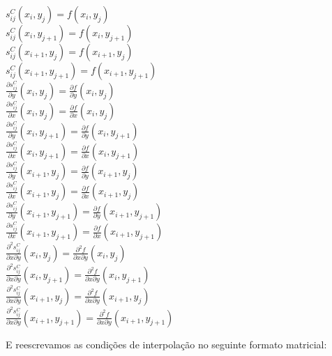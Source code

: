 \documentclass[11pt]{article}
\begin{document}
  \begin{center}
    $s_{ij}^C(x_i, y_j) = f(x_i, y_j)$ \\
    $s_{ij}^C(x_i, y_{j + 1}) = f(x_i, y_{j + 1})$ \\
    $s_{ij}^C(x_{i + 1}, y_j) = f(x_{i + 1}, y_j)$ \\
    $s_{ij}^C(x_{i + 1}, y_{j + 1}) = f(x_{i + 1}, y_{j + 1})$ \\
    $\frac{\partial s_{ij}^C}{\partial y}(x_i, y_j) = \frac{\partial f}{\partial y}(x_i, y_j)$ \\
    $\frac{\partial s_{ij}^C}{\partial x}(x_i, y_j) = \frac{\partial f}{\partial x}(x_i, y_j)$ \\
    $\frac{\partial s_{ij}^C}{\partial y}(x_i, y_{j + 1}) = \frac{\partial f}{\partial y}(x_i, y_{j + 1})$ \\
    $\frac{\partial s_{ij}^C}{\partial x}(x_i, y_{j + 1}) = \frac{\partial f}{\partial x}(x_i, y_{j + 1})$ \\
    $\frac{\partial s_{ij}^C}{\partial y}(x_{i + 1}, y_j) = \frac{\partial f}{\partial y}(x_{i + 1}, y_j)$ \\
    $\frac{\partial s_{ij}^C}{\partial x}(x_{i + 1}, y_j) = \frac{\partial f}{\partial x}(x_{i + 1}, y_j)$ \\
    $\frac{\partial s_{ij}^C}{\partial y}(x_{i + 1}, y_{j + 1}) = \frac{\partial f}{\partial y}(x_{i + 1}, y_{j + 1})$ \\
    $\frac{\partial s_{ij}^C}{\partial x}(x_{i + 1}, y_{j + 1}) = \frac{\partial f}{\partial x}(x_{i + 1}, y_{j + 1})$ \\
    $\frac{\partial^2 s_{ij}^C}{\partial x \partial y}(x_i, y_j) = \frac{\partial^2 f}{\partial x \partial y}(x_i, y_j)$ \\
    $\frac{\partial^2 s_{ij}^C}{\partial x \partial y}(x_i, y_{j + 1}) = \frac{\partial^2 f}{\partial x \partial y}(x_i, y_{j + 1})$ \\
    $\frac{\partial^2 s_{ij}^C}{\partial x \partial y}(x_{i + 1}, y_j) = \frac{\partial^2 f}{\partial x \partial y}(x_{i + 1}, y_j)$ \\
    $\frac{\partial^2 s_{ij}^C}{\partial x \partial y}(x_{i + 1}, y_{j + 1}) = \frac{\partial^2 f}{\partial x \partial y}(x_{i + 1}, y_{j + 1})$
  \end{center}

  E reescrevamos as condições de interpolação no seguinte formato matricial: \newline
\end{document}
